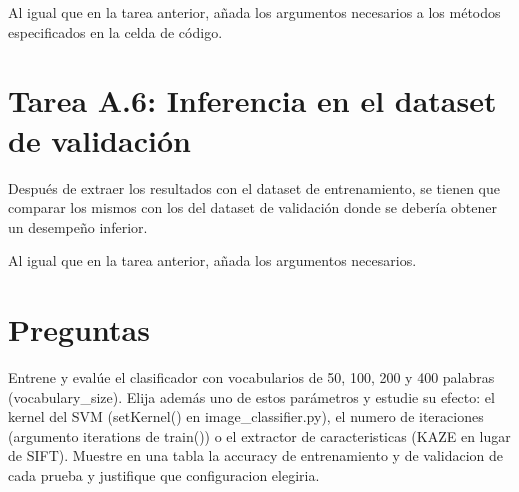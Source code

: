 Al igual que en la tarea anterior, añada los argumentos necesarios a los métodos especificados en la celda de código.

\section*{Tarea A.6: Inferencia en el dataset de validación}

Después de extraer los resultados con el dataset de entrenamiento, se tienen que comparar los mismos con los del dataset de validación donde se debería obtener un desempeño inferior.

Al igual que en la tarea anterior, añada los argumentos necesarios.


\section*{Preguntas}


\begin{tcolorbox}[colback=gray!10, colframe=gray!30, coltitle=black, title=\textbf Pregunta A.1: En busca de los mejores parámetros, halign=left]
Entrene y evalúe el clasificador con vocabularios de 50, 100, 200 y 400 palabras (vocabulary\_size). Elija además uno de estos parámetros y estudie su efecto: el kernel del SVM  (setKernel() en image\_classifier.py), el numero de iteraciones (argumento iterations de train()) o el extractor de caracteristicas (KAZE en lugar de SIFT). Muestre en una tabla la accuracy de entrenamiento y de validacion de cada prueba y justifique que configuracion elegiria.
\end{tcolorbox}
